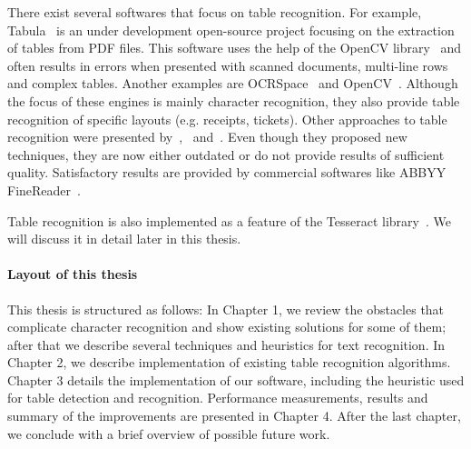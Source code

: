 There exist several softwares that focus on table recognition. For example, Tabula~\cite{Tabula} is an under development open-source project focusing on the extraction of tables from PDF files. This software uses the help of the OpenCV library~\cite{OpenCV} and often results in errors when presented with scanned documents, multi-line rows and complex tables. Another examples are OCRSpace~\cite{OCRSpace} and OpenCV~\cite{OpenCV}. Although the focus of these engines is mainly character recognition, they also provide table recognition of specific layouts (e.g. receipts, tickets). Other approaches to table recognition were presented by~\citet{pdf2table},~\citet{TRecs} and~\citet{MediumTable}. Even though they proposed new techniques, they are now either outdated or do not provide results of sufficient quality. Satisfactory results are provided by commercial softwares like ABBYY FineReader~\cite{ABBYYdpi}.

Table recognition is also implemented as a feature of the Tesseract library~\cite{tableDetHeterogeneous}. We will discuss it in detail later in this thesis. 

\paragraph{Layout of this thesis} This thesis is structured as follows: In Chapter 1, we review the obstacles that complicate character recognition and show existing solutions for some of them; after that we describe several techniques and heuristics for text recognition. In Chapter 2, we describe implementation of existing table recognition algorithms. Chapter 3 details the implementation of our software, including the heuristic used for table detection and recognition. Performance measurements, results and summary of the improvements are presented in Chapter 4. After the last chapter, we conclude with a brief overview of possible future work.
